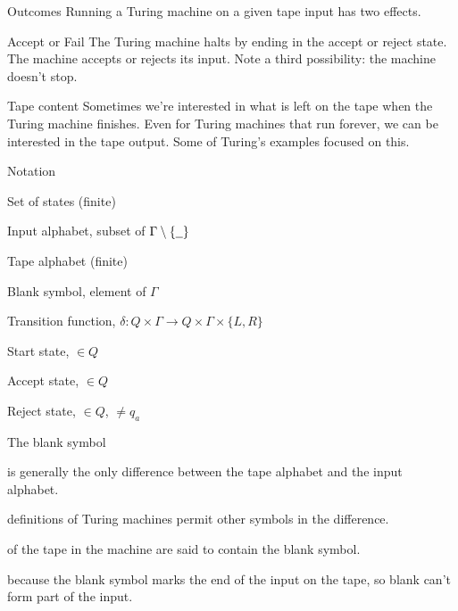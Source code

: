 \documentclass{beamer}
\begin{document}
\begin{frame}{Outcomes}
  Running a Turing machine on a given tape input has two effects.

  \vspace{2mm}
  \begin{alertblock}{Accept or Fail}
    \vspace{2mm}
    The Turing machine halts by ending in the accept or reject state.
    The machine accepts or rejects its input.
    Note a third possibility: the machine doesn't stop.
  \end{alertblock}

  \vspace{2mm}
  \begin{alertblock}{Tape content}
    \vspace{2mm}
    Sometimes we're interested in what is left on the tape when the Turing machine finishes.
    Even for Turing machines that run forever, we can be interested in the tape output.
    Some of Turing's examples focused on this.
  \end{alertblock}
\end{frame}


\begin{frame}{Notation}
  \begin{description}[aaaaaaaa]
    \item[$Q$] Set of states (finite)
    \item[$\Sigma$] Input alphabet, subset of $\Gamma \setminus \{ \underline{\hspace{2mm}} \} $
    \item[$\Gamma$] Tape alphabet (finite)
    \item[\bl] Blank symbol, element of $\Gamma$
    \item[$\delta$] Transition function, $\delta: Q \times \Gamma \rightarrow Q \times \Gamma \times \{L,R\}$
    \item[$q_0$] Start state, $\in Q$
    \item[$q_a$] Accept state, $\in Q$
    \item[$q_r$] Reject state, $\in Q$, $\neq q_a$
  \end{description}
\end{frame}


\begin{frame}{The blank symbol}
  \begin{description}
    \setlength\itemsep{4mm}
    \item[\bl] is generally the only difference between the tape alphabet and the input alphabet.
    \item[Some] definitions of Turing machines permit other symbols in the difference.
    \item[Empty cells] of the tape in the machine are said to contain the blank symbol.
    \item[Important] because the blank symbol marks the end of the input on the tape, so blank can't form part of the input.
  \end{description}
\end{frame}
\end{document}
